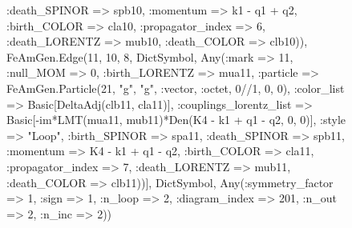 \documentclass{revtex4}
\begin{document}
\begin{figure}[!htb]
\begin{center}
{:death_SPINOR => spb10, :momentum => k1 - q1 + q2, :birth_COLOR => cla10, :propagator_index => 6, :death_LORENTZ => mub10, :death_COLOR => clb10)), FeAmGen.Edge(11, 10, 8, Dict{Symbol, Any}(:mark => 11, :null_MOM => 0, :birth_LORENTZ => mua11, :particle => FeAmGen.Particle(21, "g", "g", :vector, :octet, 0//1, 0, 0), :color_list => Basic[DeltaAdj(clb11, cla11)], :couplings_lorentz_list => Basic[-im*LMT(mua11, mub11)*Den(K4 - k1 + q1 - q2, 0, 0)], :style => "Loop", :birth_SPINOR => spa11, :death_SPINOR => spb11, :momentum => K4 - k1 + q1 - q2, :birth_COLOR => cla11, :propagator_index => 7, :death_LORENTZ => mub11, :death_COLOR => clb11))], Dict{Symbol, Any}(:symmetry_factor => 1, :sign => 1, :n_loop => 2, :diagram_index => 201, :n_out => 2, :n_inc => 2)) 
}
\end{center}
\end{figure}
\end{document}
